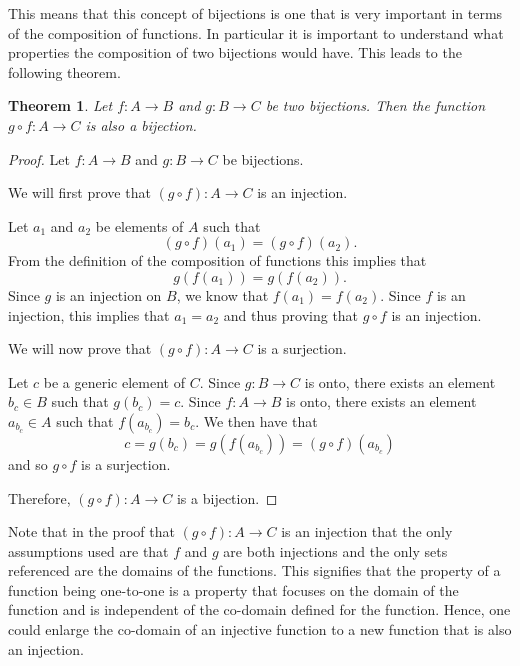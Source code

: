 \documentclass[
]{book}
\newtheorem{theorem}{Theorem}[chapter]
\theoremstyle{definition}
\theoremstyle{definition}
\theoremstyle{definition}
\theoremstyle{definition}
\theoremstyle{remark}
\begin{document}
This means that this concept of bijections is one that is very important in terms of the composition of functions. In particular it is important to understand what properties the composition of two bijections would have. This leads to the following theorem.

\begin{theorem}
\protect\hypertarget{thm:bijection2}{}\label{thm:bijection2}Let \(f:A \rightarrow B\) and \(g:B \rightarrow C\) be two bijections. Then the function \(g\circ f : A \rightarrow C\) is also a bijection.
\end{theorem}

\begin{proof}
Let \(f:A \rightarrow B\) and \(g:B\rightarrow C\) be bijections.

We will first prove that \((g\circ f):A\rightarrow C\) is an injection.

Let \(a_1\) and \(a_2\) be elements of \(A\) such that \[(g\circ f)(a_1)=(g\circ f)(a_2).\]
From the definition of the composition of functions this implies that \[g\left( f(a_1)\right) = g\left(f(a_2)\right).\]
Since \(g\) is an injection on \(B\), we know that \(f(a_1)=f(a_2)\). Since \(f\) is an injection, this implies that \(a_1=a_2\) and thus proving that \(g\circ f\) is an injection.

We will now prove that \((g\circ f):A\rightarrow C\) is a surjection.

Let \(c\) be a generic element of \(C\). Since \(g:B\rightarrow C\) is onto, there exists an element \(b_c\in B\) such that \(g(b_c)=c\). Since \(f:A \rightarrow B\) is onto, there exists an element \(a_{b_c}\in A\) such that \(f\left(a_{b_c}\right) = b_c\). We then have that \[c=g(b_c)=g\left( f\left(a_{b_c}\right) \right) = (g \circ f) \left( a_{b_c}\right)\] and so \(g\circ f\) is a surjection.

Therefore, \((g\circ f):A \rightarrow C\) is a bijection.
\end{proof}

Note that in the proof that \((g\circ f):A \rightarrow C\) is an injection that the only assumptions used are that \(f\) and \(g\) are both injections and the only sets referenced are the domains of the functions. This signifies that the property of a function being one-to-one is a property that focuses on the domain of the function and is independent of the co-domain defined for the function. Hence, one could enlarge the co-domain of an injective function to a new function that is also an injection.
\end{document}
